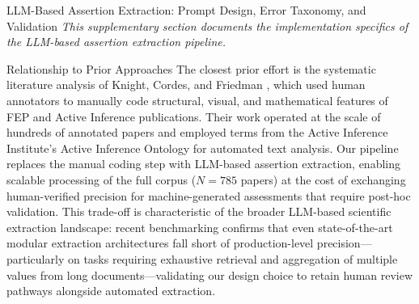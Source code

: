 \documentclass[
  ignorenonframetext,
]{beamer}
\author{\texorpdfstring{}{}}
\date{}
\begin{document}
\begin{frame}[fragile]{LLM-Based Assertion Extraction: Prompt Design,
Error Taxonomy, and Validation \label{sec:extraction_pipeline}}
\protect{}\label{llm-based-assertion-extraction-prompt-design-error-taxonomy-and-validation}
\emph{This supplementary section documents the implementation specifics
of the LLM-based assertion extraction pipeline.}

\begin{block}{Relationship to Prior Approaches}
\protect{}\label{relationship-to-prior-approaches}
The closest prior effort is the systematic literature analysis of
Knight, Cordes, and Friedman \citep{knight2022fep}, which used human
annotators to manually code structural, visual, and mathematical
features of FEP and Active Inference publications. Their work operated
at the scale of hundreds of annotated papers and employed terms from the
Active Inference Institute's Active Inference Ontology for automated
text analysis. Our pipeline replaces the manual coding step with
LLM-based assertion extraction, enabling scalable processing of the full
corpus (\(N = 785\) papers) at the cost of exchanging human-verified
precision for machine-generated assessments that require post-hoc
validation. This trade-off is characteristic of the broader LLM-based
scientific extraction landscape: recent benchmarking confirms that even
state-of-the-art modular extraction architectures fall short of
production-level precision---particularly on tasks requiring exhaustive
retrieval and aggregation of multiple values from long
documents---validating our design choice to retain human review pathways
alongside automated extraction.


\end{block}
\end{frame}
\end{document}
